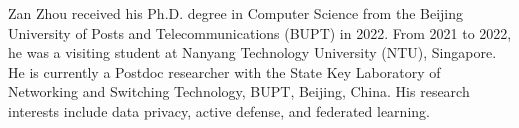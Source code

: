 \documentclass[lettersize,journal]{IEEEtran}
\begin{document}










\newpage


\begin{IEEEbiography}{Zan Zhou} received his Ph.D. degree in Computer Science from the Beijing University of Posts and Telecommunications (BUPT) in 2022. 
From 2021 to 2022, he was a visiting student at Nanyang Technology University (NTU), Singapore. 
He is currently a Postdoc researcher with the State Key Laboratory of Networking and Switching Technology, BUPT, Beijing, China. His research interests include data privacy, active defense, and federated learning. %
\end{IEEEbiography}
\end{document}
